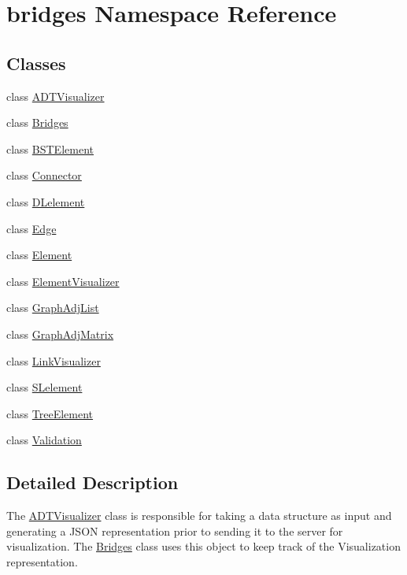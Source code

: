 \hypertarget{namespacebridges}{}\section{bridges Namespace Reference}
\label{namespacebridges}
\subsection*{Classes}
\begin{DoxyCompactItemize}
\item 
class \hyperlink{classbridges_1_1_a_d_t_visualizer}{A\+D\+T\+Visualizer}
\item 
class \hyperlink{classbridges_1_1_bridges}{Bridges}
\item 
class \hyperlink{classbridges_1_1_b_s_t_element}{B\+S\+T\+Element}
\item 
class \hyperlink{classbridges_1_1_connector}{Connector}
\item 
class \hyperlink{classbridges_1_1_d_lelement}{D\+Lelement}
\item 
class \hyperlink{classbridges_1_1_edge}{Edge}
\item 
class \hyperlink{classbridges_1_1_element}{Element}
\item 
class \hyperlink{classbridges_1_1_element_visualizer}{Element\+Visualizer}
\item 
class \hyperlink{classbridges_1_1_graph_adj_list}{Graph\+Adj\+List}
\item 
class \hyperlink{classbridges_1_1_graph_adj_matrix}{Graph\+Adj\+Matrix}
\item 
class \hyperlink{classbridges_1_1_link_visualizer}{Link\+Visualizer}
\item 
class \hyperlink{classbridges_1_1_s_lelement}{S\+Lelement}
\item 
class \hyperlink{classbridges_1_1_tree_element}{Tree\+Element}
\item 
class \hyperlink{classbridges_1_1_validation}{Validation}
\end{DoxyCompactItemize}


\subsection{Detailed Description}
The \hyperlink{classbridges_1_1_a_d_t_visualizer}{A\+D\+T\+Visualizer} class is responsible for taking a data structure as input and generating a J\+S\+O\+N representation prior to sending it to the server for visualization. The \hyperlink{classbridges_1_1_bridges}{Bridges} class uses this object to keep track of the Visualization representation. 

